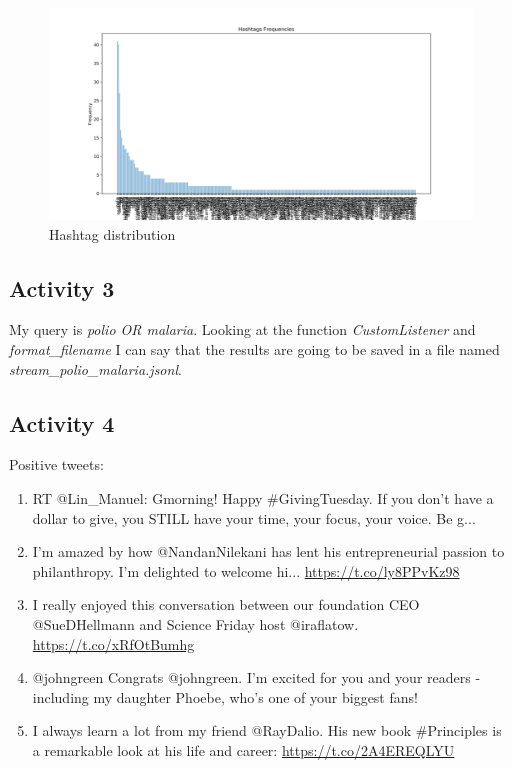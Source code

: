 \documentclass[a4paper]{article}
\begin{document}
\begin{figure}[!htpb]
\centering
\includegraphics[width=\textwidth]{res/img/hashtags_distribution}
\caption{Hashtag distribution}
\end{figure}

\subsection{Activity 3}

My query is \emph{polio OR malaria}. Looking at the function \emph{CustomListener} and \emph{format\_filename} I can say that the results are going to be saved in a file named \emph{stream\_polio\_malaria.jsonl}.

\subsection{Activity 4}

Positive tweets:

\begin{enumerate}
\item RT @Lin_Manuel: Gmorning! Happy #GivingTuesday. If you don't have a dollar to give, you STILL have your time, your focus, your voice. Be g...

\item I'm amazed by how @NandanNilekani has lent his entrepreneurial passion to philanthropy. I'm delighted to welcome hi... \url{https://t.co/ly8PPvKz98}

\item I really enjoyed this conversation between our foundation CEO @SueDHellmann and Science Friday host @iraflatow. \url{https://t.co/xRfOtBumhg}

\item @johngreen Congrats @johngreen. I'm excited for you and your readers - including my daughter Phoebe, who's one of your biggest fans!

\item I always learn a lot from my friend @RayDalio. His new book #Principles is a remarkable look at his life and career: \url{https://t.co/2A4EREQLYU}
\end{enumerate}
\end{document}
